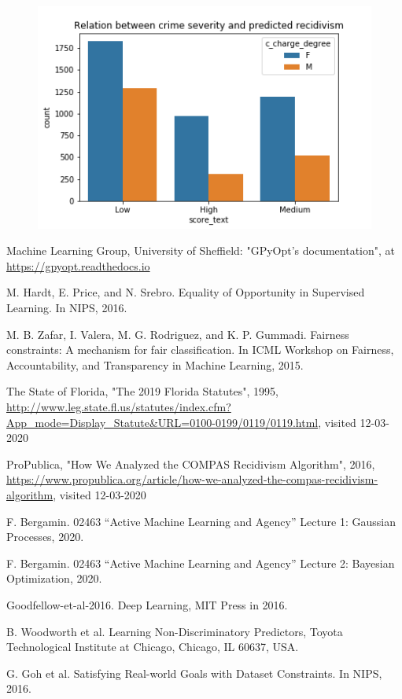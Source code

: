 \documentclass[11pt, fleqn, titlepage]{article}
\begin{document}
	\begin{figure}[H]
		\centering
		\includegraphics[width=0.5\linewidth]{imgs/charge_degree_score}
		\caption{}
		\label{fig:chargedegreescore}
	\end{figure}
	
	\begin{thebibliography}{9}
		
		 Machine Learning Group, University of Sheffield: "GPyOpt’s documentation", at \url{https://gpyopt.readthedocs.io}
		
		 M. Hardt, E. Price, and N. Srebro. Equality of Opportunity in Supervised Learning. In NIPS, 2016.
		
		 M. B. Zafar, I. Valera, M. G. Rodriguez, and K. P. Gummadi. Fairness constraints: A mechanism for fair classification.
		In ICML Workshop on Fairness, Accountability, and Transparency in Machine Learning, 2015.
		
		 The State of Florida, "The 2019 Florida Statutes", 1995,  \url{http://www.leg.state.fl.us/statutes/index.cfm?App_mode=Display_Statute&URL=0100-0199/0119/0119.html}, visited 12-03-2020
		
		 ProPublica, "How We Analyzed the COMPAS Recidivism Algorithm", 2016, \url{https://www.propublica.org/article/how-we-analyzed-the-compas-recidivism-algorithm}, visited 12-03-2020
		
		 F. Bergamin. 02463 “Active Machine Learning and Agency” Lecture 1: Gaussian Processes, 2020.
		
		 F. Bergamin. 02463 “Active Machine Learning and Agency” Lecture 2: Bayesian Optimization, 2020.
		
		 Goodfellow-et-al-2016. Deep Learning, MIT Press in 2016. 
		
		 B. Woodworth et al. Learning Non-Discriminatory Predictors, Toyota Technological Institute at Chicago, Chicago, IL 60637, USA.
		
		 G. Goh et al. Satisfying Real-world Goals with Dataset Constraints. In NIPS, 2016.
		
	\end{thebibliography}
	
	\newpage
	
	
\end{document}
